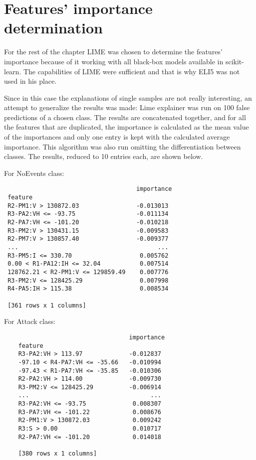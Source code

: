 \section{Features' importance determination}
For the rest of the chapter LIME was chosen to determine the features' importance because of it working with all black-box models available in scikit-learn. The capabilities of LIME were sufficient and that is why ELI5 was not used in his place.

Since in this case the explanations of single samples are not really interesting, an attempt to generalize the results was made: Lime explainer was run on 100 false predictions of a chosen class. The results are concatenated together, and for all the features that are duplicated, the importance is calculated as the mean value of the importances and only one entry is kept with the calculated average importance. This algorithm was also run omitting the differentiation between classes. The results, reduced to 10 entries each, are shown below.

For NoEvents class:
\begin{verbatim}
                                     importance
 feature                                      
 R2-PM1:V > 130872.03                -0.013013
 R3-PA2:VH <= -93.75                 -0.011134
 R2-PA7:VH <= -101.20                -0.010218
 R3-PM2:V > 130431.15                -0.009583
 R2-PM7:V > 130857.40                -0.009377
 ...                                       ...
 R3-PM5:I <= 330.70                   0.005762
 0.00 < R1-PA12:IH <= 32.04           0.007514
 128762.21 < R2-PM1:V <= 129859.49    0.007776
 R3-PM2:V <= 128425.29                0.007998
 R4-PA5:IH > 115.38                   0.008534
 
 [361 rows x 1 columns]
\end{verbatim}

For Attack class:
\begin{verbatim}
                                   importance
    feature                                 
    R3-PA2:VH > 113.97             -0.012837
    -97.10 < R4-PA7:VH <= -35.66   -0.010994
    -97.43 < R1-PA7:VH <= -35.85   -0.010306
    R2-PA2:VH > 114.00             -0.009730
    R3-PM2:V <= 128425.29          -0.006914
    ...                                  ...
    R3-PA2:VH <= -93.75             0.008307
    R3-PA7:VH <= -101.22            0.008676
    R2-PM1:V > 130872.03            0.009242
    R3:S > 0.00                     0.010717
    R2-PA7:VH <= -101.20            0.014018
    
    [380 rows x 1 columns]
\end{verbatim}

